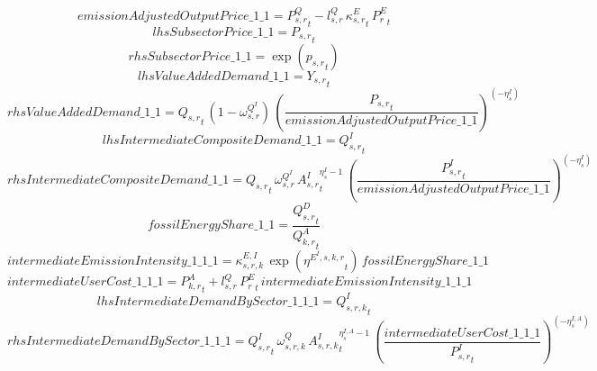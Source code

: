 \begin{dmath*}
emissionAdjustedOutputPrice\_1\_1 = {{P^Q_{s,r}}}_{t}-{{l^{Q}_{s,r}}}\, {{\kappa^{E}_{s,r}}}_{t}\, {{P^E_r}}_{t}
\end{dmath*}
\begin{dmath*}
lhsSubsectorPrice\_1\_1 = {{P_{s,r}}}_{t}
\end{dmath*}
\begin{dmath*}
rhsSubsectorPrice\_1\_1 = \exp\left({{p_{s,r}}}_{t}\right)
\end{dmath*}
\begin{dmath*}
lhsValueAddedDemand\_1\_1 = {{Y_{s,r}}}_{t}
\end{dmath*}
\begin{dmath*}
rhsValueAddedDemand\_1\_1 = {{Q_{s,r}}}_{t}\, \left(1-{{\omega^{Q^{I}}_{s,r}}}\right)\, \left(\frac{{{P_{s,r}}}_{t}}{{emissionAdjustedOutputPrice\_1\_1}}\right)^{\left(-{{\eta^{I}_{s}}}\right)}
\end{dmath*}
\begin{dmath*}
lhsIntermediateCompositeDemand\_1\_1 = {{Q^{I}_{s,r}}}_{t}
\end{dmath*}
\begin{dmath*}
rhsIntermediateCompositeDemand\_1\_1 = {{Q_{s,r}}}_{t}\, {{\omega^{Q^{I}}_{s,r}}}\, {{A^{I}_{s,r}}}_{t}^{{{\eta^{I}_{s}}}-1}\, \left(\frac{{{P^{I}_{s,r}}}_{t}}{{emissionAdjustedOutputPrice\_1\_1}}\right)^{\left(-{{\eta^{I}_{s}}}\right)}
\end{dmath*}
\begin{dmath*}
fossilEnergyShare\_1\_1 = \frac{{{Q^{D}_{s,r}}}_{t}}{{{Q^{A}_{k,r}}}_{t}}
\end{dmath*}
\begin{dmath*}
intermediateEmissionIntensity\_1\_1\_1 = {{\kappa^{E,I}_{s,r,k}}}\, \exp\left({{\eta^{E^{I},s,k,r}}}_{t}\right)\, {fossilEnergyShare\_1\_1}
\end{dmath*}
\begin{dmath*}
intermediateUserCost\_1\_1\_1 = {{P^{A}_{k,r}}}_{t}+{{l^{Q}_{s,r}}}\, {{P^E_r}}_{t}\, {intermediateEmissionIntensity\_1\_1\_1}
\end{dmath*}
\begin{dmath*}
lhsIntermediateDemandBySector\_1\_1\_1 = {{Q^{I}_{s,r,k}}}_{t}
\end{dmath*}
\begin{dmath*}
rhsIntermediateDemandBySector\_1\_1\_1 = {{Q^{I}_{s,r}}}_{t}\, {{\omega^{Q}_{s,r,k}}}\, {{A^{I}_{s,r,k}}}_{t}^{{{\eta^{I,A}_{s}}}-1}\, \left(\frac{{intermediateUserCost\_1\_1\_1}}{{{P^{I}_{s,r}}}_{t}}\right)^{\left(-{{\eta^{I,A}_{s}}}\right)}
\end{dmath*}
